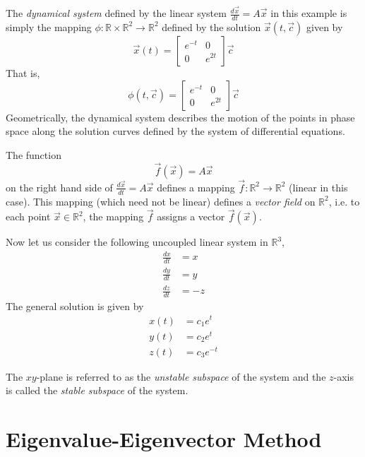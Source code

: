 \documentclass[11pt]{book}
\theoremstyle{definition}\newtheorem{definition}[subsection]{Definition}
\theoremstyle{definition}\newtheorem{example}[subsection]{Example}
\theoremstyle{definition}\newtheorem{notation}[subsection]{Notation}
\theoremstyle{definition}\newtheorem{remark}[subsection]{Remark}
\theoremstyle{theorem}\newtheorem{theorem}[subsection]{Theorem}
\theoremstyle{theorem}\newtheorem{lemma}[subsection]{Lemma}
\theoremstyle{theorem}\newtheorem{proposition}[subsection]{Proposition}
\theoremstyle{theorem}\newtheorem{corollary}[subsection]{Corollary}
\theoremstyle{theorem}\newtheorem{case}{Case}
\theoremstyle{remark}\newtheorem{subcase}{Subcase}[case]
\newcommand{\R}{\mathbb{R}}
\begin{document}
The \emph{dynamical system} defined by the linear system $\frac{d\vec{x}}{dt} = A\vec{x}$ in this example is simply the mapping $\phi : \R \times \R^2 \to \R^2$ defined by the solution $\vec{x}(t, \vec{c})$ given by
\begin{equation*}
    \vec{x}(t) = \begin{bmatrix} e^{-t} & 0 \\ 0 & e^{2t} \end{bmatrix} \vec{c}
\end{equation*}
That is,
\begin{equation*}
    \phi(t, \vec{c}) = \begin{bmatrix} e^{-t} & 0 \\ 0 & e^{2t} \end{bmatrix} \vec{c}
\end{equation*}
Geometrically, the dynamical system describes the motion of the points in phase space along the solution curves defined by the system of differential equations.

The function
\begin{equation*}
    \vec{f}(\vec{x}) = A\vec{x}
\end{equation*}
on the right hand side of $\frac{d\vec{x}}{dt} = A\vec{x}$ defines a mapping $\vec{f} : \R^2 \to \R^2$ (linear in this case). This mapping (which need not be linear) defines a \emph{vector field} on $\R^2$, i.e. to each point $\vec{x} \in \R^2$, the mapping $\vec{f}$ assigns a vector $\vec{f}(\vec{x})$.

Now let us consider the following uncoupled linear system in $\R^3$,
\begin{align*}
    \frac{dx}{dt} &= x \\
    \frac{dy}{dt} &= y \\
    \frac{dz}{dt} &= -z
\end{align*}
The general solution is given by
\begin{align*}
    x(t) &= c_1e^t \\
    y(t) &= c_2e^t \\
    z(t) &= c_3e^{-t}
\end{align*}

The $xy$-plane is referred to as the \emph{unstable subspace} of the system and the $z$-axis is called the \emph{stable subspace} of the system.

\section{Eigenvalue-Eigenvector Method}
\end{document}
